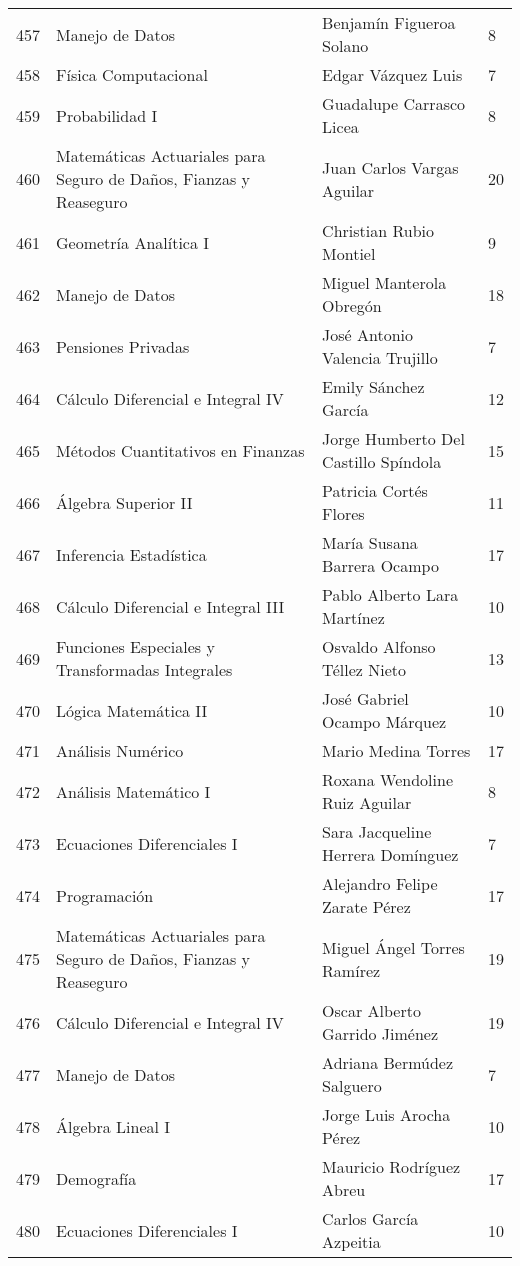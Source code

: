 \begin{table}[ht]
\begin{tabular}{rlll}
  457 & Manejo de Datos & Benjamín Figueroa Solano & 8 \\ 
  458 & Física Computacional & Edgar Vázquez Luis & 7 \\ 
  459 & Probabilidad I & Guadalupe Carrasco Licea & 8 \\ 
  460 & Matemáticas Actuariales para Seguro de Daños, Fianzas y Reaseguro & Juan Carlos Vargas Aguilar & 20 \\ 
  461 & Geometría Analítica I & Christian Rubio Montiel & 9 \\ 
  462 & Manejo de Datos & Miguel Manterola Obregón & 18 \\ 
  463 & Pensiones Privadas & José Antonio Valencia Trujillo & 7 \\ 
  464 & Cálculo Diferencial e Integral IV & Emily Sánchez García & 12 \\ 
  465 & Métodos Cuantitativos en Finanzas & Jorge Humberto Del Castillo Spíndola & 15 \\ 
  466 & Álgebra Superior II & Patricia Cortés Flores & 11 \\ 
  467 & Inferencia Estadística & María Susana Barrera Ocampo & 17 \\ 
  468 & Cálculo Diferencial e Integral III & Pablo Alberto Lara Martínez & 10 \\ 
  469 & Funciones Especiales y Transformadas Integrales & Osvaldo Alfonso Téllez Nieto & 13 \\ 
  470 & Lógica Matemática II & José Gabriel Ocampo Márquez & 10 \\ 
  471 & Análisis Numérico & Mario Medina Torres & 17 \\ 
  472 & Análisis Matemático I & Roxana Wendoline Ruiz Aguilar & 8 \\ 
  473 & Ecuaciones Diferenciales I & Sara Jacqueline Herrera Domínguez & 7 \\ 
  474 & Programación & Alejandro Felipe Zarate Pérez & 17 \\ 
  475 & Matemáticas Actuariales para Seguro de Daños, Fianzas y Reaseguro & Miguel Ángel Torres Ramírez & 19 \\ 
  476 & Cálculo Diferencial e Integral IV & Oscar Alberto Garrido Jiménez & 19 \\ 
  477 & Manejo de Datos & Adriana Bermúdez Salguero & 7 \\ 
  478 & Álgebra Lineal I & Jorge Luis Arocha Pérez & 10 \\ 
  479 & Demografía & Mauricio Rodríguez Abreu & 17 \\ 
  480 & Ecuaciones Diferenciales I & Carlos García Azpeitia & 10 \\ 

\end{tabular}
\end{table}
